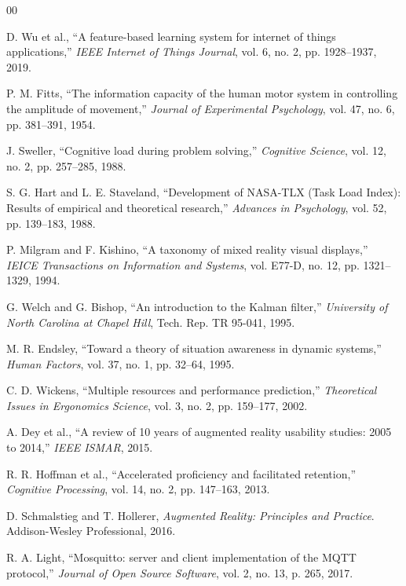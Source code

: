 \documentclass[conference]{IEEEtran}
\begin{document}
\begin{thebibliography}{00}

 D. Wu et al., ``A feature-based learning system for internet of things applications,'' \textit{IEEE Internet of Things Journal}, vol. 6, no. 2, pp. 1928--1937, 2019.

 P. M. Fitts, ``The information capacity of the human motor system in controlling the amplitude of movement,'' \textit{Journal of Experimental Psychology}, vol. 47, no. 6, pp. 381--391, 1954.

 J. Sweller, ``Cognitive load during problem solving,'' \textit{Cognitive Science}, vol. 12, no. 2, pp. 257--285, 1988.

 S. G. Hart and L. E. Staveland, ``Development of NASA-TLX (Task Load Index): Results of empirical and theoretical research,'' \textit{Advances in Psychology}, vol. 52, pp. 139--183, 1988.

 P. Milgram and F. Kishino, ``A taxonomy of mixed reality visual displays,'' \textit{IEICE Transactions on Information and Systems}, vol. E77-D, no. 12, pp. 1321--1329, 1994.

 G. Welch and G. Bishop, ``An introduction to the Kalman filter,'' \textit{University of North Carolina at Chapel Hill}, Tech. Rep. TR 95-041, 1995.

 M. R. Endsley, ``Toward a theory of situation awareness in dynamic systems,'' \textit{Human Factors}, vol. 37, no. 1, pp. 32--64, 1995.

 C. D. Wickens, ``Multiple resources and performance prediction,'' \textit{Theoretical Issues in Ergonomics Science}, vol. 3, no. 2, pp. 159--177, 2002.

 A. Dey et al., ``A review of 10 years of augmented reality usability studies: 2005 to 2014,'' \textit{IEEE ISMAR}, 2015.

 R. R. Hoffman et al., ``Accelerated proficiency and facilitated retention,'' \textit{Cognitive Processing}, vol. 14, no. 2, pp. 147--163, 2013.

 D. Schmalstieg and T. Hollerer, \textit{Augmented Reality: Principles and Practice}. Addison-Wesley Professional, 2016.

 R. A. Light, ``Mosquitto: server and client implementation of the MQTT protocol,'' \textit{Journal of Open Source Software}, vol. 2, no. 13, p. 265, 2017.


\end{thebibliography}
\end{document}
